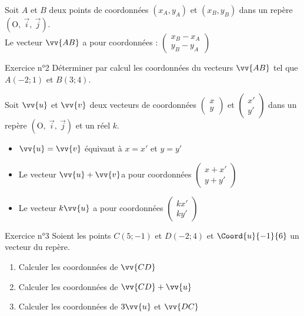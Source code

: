 \documentclass[12pt,a4paper]{article}
\def\Oij{$\left(\text{O},~\vec{i},~\vec{j}\right)$}
\begin{document}
\begin{pro}
Soit $A$ et $B$ deux points de coordonnées $(x_A,y_A)$ et $(x_B,y_B)$ dans un repère \Oij{}.\\
Le vecteur $\vv{AB}$ a pour coordonnées :
$\begin{pmatrix} 
      x_B-x_A\\ 
      y_B-y_A 
    \end{pmatrix}$
\end{pro}

\begin{mybox}{Exercice n°2}
Déterminer par calcul les coordonnées du vecteurs $\vv{AB}$ tel que $A(-2; 1)$ et $B(3; 4)$.

\end{mybox}

\compo[0.7]{

\vspace{3cm}


}
{}




\begin{pro}
Soit $\vv{u}$ et $\vv{v}$ deux vecteurs de coordonnées 
$\begin{pmatrix} 
      x\\ 
      y
\end{pmatrix}$
et 
$\begin{pmatrix} 
      x'\\ 
      y'
\end{pmatrix}$
dans un repère \Oij{} et un réel $k$.
\begin{itemize}
    \item $\vv{u}=\vv{v}$ équivaut à $x=x'$ et $y=y'$
    \item Le vecteur $\vv{u}+\vv{v}$a pour coordonnées 
    $\begin{pmatrix} 
      x+x'\\ 
      y+y'
\end{pmatrix}$
\item Le vecteur $k\vv{u}$ a pour coordonnées
 $\begin{pmatrix} 
      kx'\\ 
      ky'
\end{pmatrix}$
\end{itemize}
\end{pro}

\begin{mybox}{Exercice n°3}
Soient les points $C(5;-1)$ et $D(-2; 4)$ et $\Coord{u}{-1}{6}$ un vecteur du repère.\\
\begin{enumerate}
    \item Calculer les coordonnées de $\vv{CD}$
    \item  Calculer les coordonnées de $\vv{CD}+\vv{u}$
    \item Calculer les coordonnées de $3\vv{u}$ et $\vv{DC}$
\end{enumerate}
\end{mybox}
\end{document}
